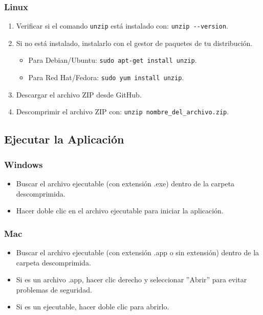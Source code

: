 \subsubsection*{Linux}

\begin{enumerate}[label=\arabic*.-]
    \item Verificar si el comando \verb|unzip| está instalado con: \verb|unzip --version|.
    \item Si no está instalado, instalarlo con el gestor de paquetes de tu distribución.
        \begin{itemize}
            \item Para Debian/Ubuntu: \verb|sudo apt-get install unzip|.
            \item Para Red Hat/Fedora: \verb|sudo yum install unzip|.
        \end{itemize}
    \item Descargar el archivo ZIP desde GitHub.
    \item Descomprimir el archivo ZIP con: \verb|unzip nombre_del_archivo.zip|.
\end{enumerate}

\subsection*{Ejecutar la Aplicación}

\subsubsection*{Windows}

\begin{itemize}
    \item Buscar el archivo ejecutable (con extensión .exe) dentro de la carpeta descomprimida.
    \item Hacer doble clic en el archivo ejecutable para iniciar la aplicación.
\end{itemize}

\subsubsection*{Mac}

\begin{itemize}
    \item Buscar el archivo ejecutable (con extensión .app o sin extensión) dentro de la carpeta descomprimida.
    \item Si es un archivo .app, hacer clic derecho y seleccionar ''Abrir'' para evitar problemas de seguridad.
    \item Si es un ejecutable, hacer doble clic para abrirlo.
\end{itemize}

